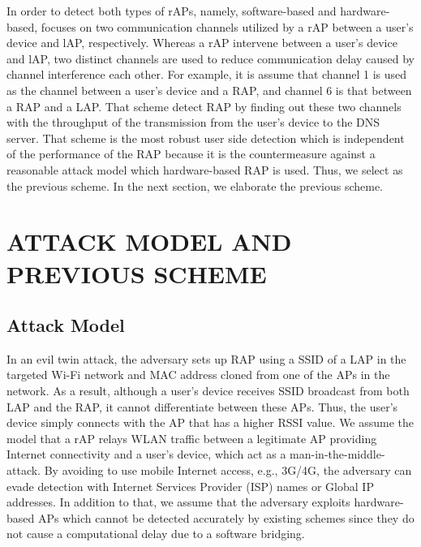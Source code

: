 \documentclass[conference]{IEEEtran}
\begin{document}
In order to detect both types of rAPs, namely, software-based and hardware-based, \cite{previous} focuses on two communication channels utilized by a rAP between a user's device and lAP, respectively.
Whereas a rAP intervene between a user's device and lAP, two distinct channels are used to reduce communication delay caused by channel interference each other.
For example, it is assume that channel 1 is used as the channel between a user's device and a RAP, and channel 6 is that between a RAP and a LAP.
That scheme detect RAP by finding out these two channels with the throughput of the transmission from the user's device to the DNS server.
That scheme is the most robust user side detection which is independent of the performance of the RAP because it is the countermeasure against a reasonable attack model which hardware-based RAP is used.
Thus, we select \cite{previous} as the previous scheme.
In the next section, we elaborate the previous scheme.



\section{ATTACK MODEL AND PREVIOUS SCHEME}
\subsection{Attack Model}
In an evil twin attack, the adversary sets up RAP using a SSID of a LAP in the targeted Wi-Fi network and MAC address cloned from one of the APs in the network.
As a result, although a user's device receives SSID broadcast from both LAP and the RAP, it cannot differentiate between these APs.
Thus, the user's device simply connects with the AP that has a higher RSSI value.
We assume the model that a rAP relays WLAN traffic between a legitimate AP providing Internet connectivity and a user's device, which act as a man-in-the-middle-attack.
By avoiding to use mobile Internet access, e.g., 3G/4G, the adversary can evade detection with Internet Services Provider (ISP) names or Global IP addresses\cite{rtt}.
In addition to that, we assume that the adversary exploits hardware-based APs which cannot be detected accurately by existing schemes since they do not cause a computational delay due to a software bridging.
\end{document}
